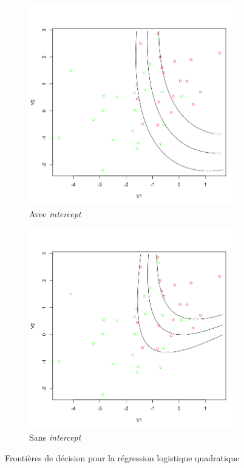 \documentclass[a4paper,10pt]{report}
\begin{document}
\begin{figure}[H]
	\centering
	\captionsetup{justification=centering, margin=2cm}
	\begin{subfigure}[b]{0.5\linewidth}
		\centering
		\captionsetup{justification=centering, margin=1cm}
		\includegraphics[width=1\linewidth]{img/1-3-verif-log-quad-intercept-true}
		\caption{\small Avec \textit{intercept}}
	\end{subfigure}%
	\begin{subfigure}[b]{0.5\linewidth}
		\centering
		\captionsetup{justification=centering, margin=1cm}
		\includegraphics[width=1\linewidth]{img/1-3-verif-log-quad-intercept-false}
		\caption{\small Sans \textit{intercept}}
	\end{subfigure}%
	\caption{\small Frontières de décision pour la régression logistique quadratique}
	\label{fig:1-3-log-quad}%
\end{figure}
\end{document}
